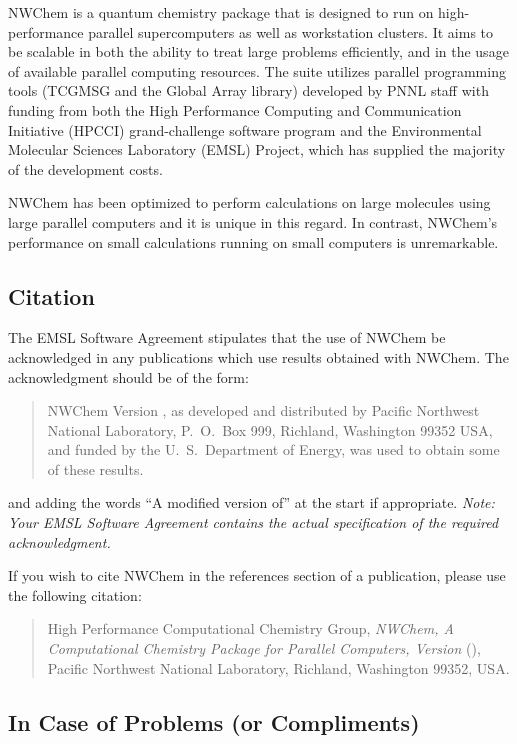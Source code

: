 
NWChem is a quantum chemistry package that is
designed to run on high-performance parallel supercomputers as well as
workstation clusters.  It aims to be scalable in both the ability to
treat large problems efficiently, and in the usage of available
parallel computing resources.  The suite utilizes parallel programming
tools (TCGMSG and the Global Array library) developed by PNNL staff
with funding from both the High Performance Computing and
Communication Initiative (HPCCI) grand-challenge software program and
the Environmental Molecular Sciences Laboratory (EMSL) Project, which
has supplied the majority of the development costs.

NWChem has been optimized to perform calculations on large molecules
using large parallel computers and it is unique in this regard.  In
contrast, NWChem's performance on small calculations running on
small computers is unremarkable.

\subsection{Citation}

The EMSL Software Agreement stipulates that the use of NWChem be
acknowledged in any publications which use results obtained with
NWChem.  The acknowledgment should be of the form:
\begin{quote}
  NWChem Version \nwchemversion, as developed and distributed by
  Pacific Northwest National Laboratory, P.~O.~Box 999, Richland,
  Washington 99352 USA, and funded by the U.~S.~Department of Energy,
  was used to obtain some of these results.
\end{quote}
and adding the words ``A modified version of'' at the start
if appropriate.  {\em Note: Your EMSL Software Agreement contains the
actual specification of the required acknowledgment.}

If you wish to cite NWChem in the references section of a publication,
please use the following citation:
\begin{quote}
  High Performance Computational Chemistry Group, {\em NWChem, A
    Computational Chemistry Package for Parallel Computers, Version
    \nwchemversion{}} (\nwchemyear), Pacific Northwest National
  Laboratory, Richland, Washington 99352, USA.
\end{quote}

\subsection{In Case of Problems (or Compliments)}

